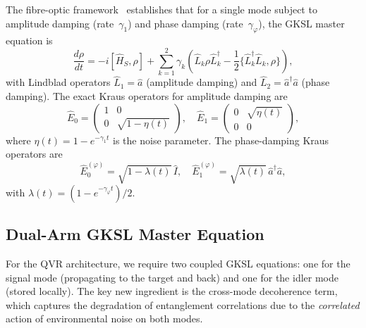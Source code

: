 \documentclass[journal]{IEEEtran}
\begin{document}
The fibre-optic framework~\cite{gautum2024rigorous} establishes that for a single mode subject to amplitude damping (rate~$\gamma_1$) and phase damping (rate~$\gamma_\varphi$), the GKSL master equation is
\begin{equation}\label{eq:single_gksl}
\frac{d\rho}{dt} = -i[\hat{H}_S, \rho] + \sum_{k=1}^{2}\gamma_k\left(\hat{L}_k\rho\hat{L}_k^\dagger - \frac{1}{2}\{\hat{L}_k^\dagger\hat{L}_k, \rho\}\right),
\end{equation}
with Lindblad operators $\hat{L}_1 = \hat{a}$ (amplitude damping) and $\hat{L}_2 = \hat{a}^\dagger\hat{a}$ (phase damping). The exact Kraus operators for amplitude damping are
\begin{equation}\label{eq:kraus_amplitude}
\hat{E}_0 = \begin{pmatrix} 1 & 0 \\ 0 & \sqrt{1-\eta(t)} \end{pmatrix}, \quad \hat{E}_1 = \begin{pmatrix} 0 & \sqrt{\eta(t)} \\ 0 & 0 \end{pmatrix},
\end{equation}
where $\eta(t) = 1 - e^{-\gamma_1 t}$ is the noise parameter. The phase-damping Kraus operators are
\begin{equation}\label{eq:kraus_phase}
\hat{E}_0^{(\varphi)} = \sqrt{1-\lambda(t)}\,\hat{I}, \quad \hat{E}_1^{(\varphi)} = \sqrt{\lambda(t)}\,\hat{a}^\dagger\hat{a},
\end{equation}
with $\lambda(t) = (1 - e^{-\gamma_\varphi t})/2$.

\subsection{Dual-Arm GKSL Master Equation}

For the QVR architecture, we require two coupled GKSL equations: one for the signal mode (propagating to the target and back) and one for the idler mode (stored locally). The key new ingredient is the cross-mode decoherence term, which captures the degradation of entanglement correlations due to the \textit{correlated} action of environmental noise on both modes.
\end{document}
